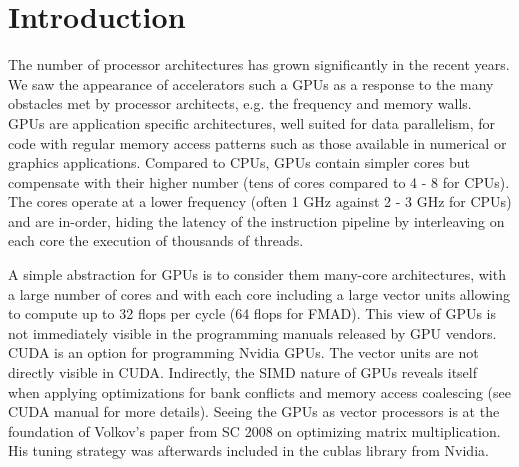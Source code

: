 \section{Introduction}
The number of processor architectures has grown significantly in the recent
years. We saw the appearance of accelerators such a GPUs as a response to the
many obstacles met by processor architects, e.g. the frequency and memory walls.
GPUs are application specific architectures, well suited for data parallelism,
for code with regular memory access patterns such as those available in
numerical or graphics applications. Compared to CPUs, GPUs contain simpler cores
but compensate with their higher number (tens of cores compared to 4 - 8 for
CPUs). The cores operate at a lower frequency (often 1 GHz against 2 - 3 GHz for
CPUs) and are in-order, hiding the latency of the instruction pipeline by
interleaving on each core the execution of thousands of threads.

A simple abstraction for GPUs is to consider them many-core architectures, with
a large number of cores and with each core including a large vector units
allowing to compute up to 32 flops per cycle (64 flops for FMAD). This view of
GPUs is not immediately visible in the programming manuals released by GPU
vendors. CUDA is an option for programming Nvidia GPUs. The vector units are not
directly visible in CUDA. Indirectly, the SIMD nature of GPUs reveals itself
when applying optimizations for bank conflicts and memory access coalescing (see
CUDA manual for more details). Seeing the GPUs as vector processors is at the
foundation of Volkov's paper from SC 2008 on optimizing matrix multiplication.
His tuning strategy was afterwards included in the cublas library from Nvidia.


